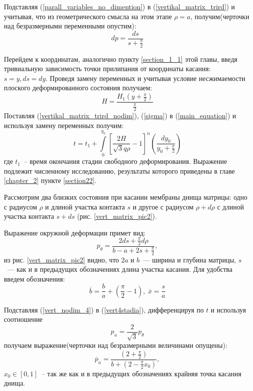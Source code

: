 Подставляя (\ref{parall_variables_no_dimention}) в (\ref{vertikal_matrix_trird}) и учитывая, что из геометрического смысла на этом этапе $\rho = a$, получим(черточки над безразмерными переменными опустим):
	\begin{equation}
	dp = \dfrac{ds}{s+\frac{\pi}{2}}
	\label{vertikal_matrix_trird_nodim}
	\end{equation}

Перейдем к координатам, аналогично пункту \ref{section_1_1} этой главы, введя тривиальную зависимость точки прилипания от координаты касания: $s=y, ds = dy$.
Проведя замену переменных и учитывая условие несжимаемости плоского деформированного состояния получаем:
	\begin{equation}
	H=\dfrac{H_1(y+\frac{\pi}{2})}{\frac{\pi}{2}}
	\end{equation}
Поставляя (\ref{vertikal_matrix_trird_nodim}), (\ref{sigma}) в (\ref{main_equation}) и используя замену переменных получим:
\begin{equation}
t = t_1 + \int\limits_0^{y_0}\left[ \dfrac{2H}{\sqrt3 q \rho} -1\right]^n\left(\dfrac{dy_0}{y_0+\frac{\pi}{2}}\right)
\end{equation}
	где $t_1$~-- время окончания стадии свободного деформирования.   
Выражение подлежит численному исследованию, результаты которого приведены в главе \ref{chapter_2} пункте \ref{section22}.

	

	
	Рассмотрим два близких состояния при касании мембраны днища матрицы:
	одно  с радиусом $\rho$ и длиной участка контакта $s$ и другое с радиусом $\rho+d\rho$ с длиной участка контакта $s+ds$ (рис. \ref{vert_matrix_pic2}).
	
	Выражение окружной деформации примет вид:
	\begin{equation}
	p_\theta = \dfrac{2ds+\frac{\pi}{2}d\rho}{b-a+2s+\frac{\pi}{2}},
	\label{vert4stadia}
	\end{equation}
   из рис. \ref{vert_matrix_pic2} видно, что $2a$ и $b$~--- ширина и глубина матрицы, $s$~--- как и в предыдущих обозначениях длина участка касания. Для удобства введем обозначения:
   \begin{equation}
   \overline{b} = \dfrac{b}{a}+\left(\dfrac \pi 2 -1\right),\; \overline{x} = \dfrac{s}{a}
	\label{vert_nodim_4}
   \end{equation}
	   
	
    Подставляя (\ref{vert_nodim_4}) в (\ref{vert4stadia}), дифференцируя по $t$ 
    и используя соотношение 
    \begin{equation} 
    p_u=\frac{2}{\sqrt 3}p_\theta
	\end{equation}
     получаем выражение(черточки над безразмерными величинами опущены):
    \begin{equation}
    \dot{p_u} = \dfrac{\left( 2+\frac{\pi}{2}\right)}{b+\left(2-\frac{\pi}{2}x_0\right)},
    \label{vert_nodim}
    \end{equation}
	$x_0 \in [0, 1]$~-- так же как и в предыдущих обозначениях крайняя точка касания днища.
	
